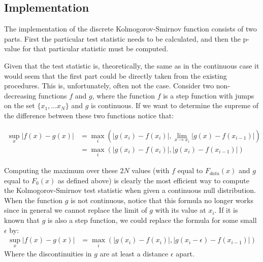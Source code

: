 \documentclass[article]{jss}
\begin{document}
\subsection{Implementation}

The implementation of the discrete Kolmogorov-Smirnov function consists of two parts. First the particular test statistic needs to be calculated,
and then the p-value for that particular statistic must be computed. 

Given that the test statistic is, theoretically, the same as in the
continuous case it would seem that the first part could be directly taken from the existing procedures. This is, unfortunately, often not the case.
Consider two non-decreasing functions $f$ and $g$, where the function $f$ is a step function with jumps on the set $\{x_1, \ldots x_N \}$ and $g$
is continuous. If we want to determine the supreme of the difference between these two functions notice that:

\begin{align}
\sup_x \left| f(x)- g(x) \right| &= \max_i \left( \left|g(x_i) - f(x_i) \right|, \lim_{x \rightarrow x_i} \left| g(x) - f(x_{i-1}) \right| \right) \\
&=  \max_i \left( \left|g(x_i) - f(x_i) \right|, \left| g(x_i) - f(x_{i-1}) \right| \right)
\end{align}

Computing the maximum over these $2N$ values (with $f$ equal to $F_{data}(x)$ and $g$ equal to $F_0(x)$ as defined above) is clearly the 
most efficient way to compute the Kolmogorov-Smirnov test statistic when given a continuous null distribution. When the function $g$ is not
continuous, notice that this formula no longer works since in general we cannot replace the limit of $g$ with its value at $x_i$. If it is known that $g$
is also a step function, we could replace the formula for some small $\epsilon$ by:
\begin{align}
\sup_x \left| f(x)- g(x) \right| &=  \max_i \left( \left|g(x_i) - f(x_i) \right|, \left| g(x_i - \epsilon) - f(x_{i-1}) \right| \right)
\end{align}
Where the discontinuities in $g$ are at least a distance $\epsilon$ apart. 

\end{document}
